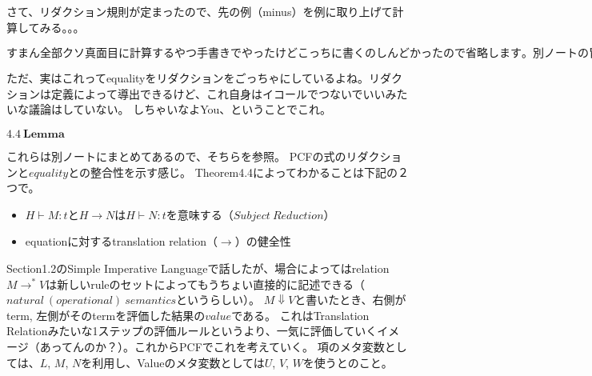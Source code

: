 \documentclass[9pt,fleqn]{jarticle}
\begin{document}
\nl

さて、リダクション規則が定まったので、先の例（minus）を例に取り上げて計算してみる。。。

\nl
$\bm{すまん全部クソ真面目に計算するやつ手書きでやったけどこっちに書くのしんどかったので省略します。別ノートの冒頭に個人的な歴史的経緯からAddの例を書いたやつがあるので（minusでなくてすまん）気になったらそっちを見てください。定義どおりにやるだけなので難しくないです。}$
\nl

ただ、実はこれってequalityをリダクションをごっちゃにしているよね。リダクションは定義によって導出できるけど、これ自身はイコールでつないでいいみたいな議論はしていない。
しちゃいなよYou、ということでこれ。


\nl
$\bm{4.4\ Lemma}$
\nl

これらは別ノートにまとめてあるので、そちらを参照。
PCFの式のリダクションと$equality$との整合性を示す感じ。
Theorem4.4によってわかることは下記の２つで。
\begin{itemize}
	\item[1] $H \vdash M : t $と$H \rightarrow N$は$H \vdash N : t$を意味する（$Subject\ Reduction$）
	\item[2] equationに対するtranslation relation（$\rightarrow$）の健全性
\end{itemize}

Section1.2のSimple Imperative Languageで話したが、場合によってはrelation $M \rightarrow^{*} V$は新しいruleのセットによってもうちょい直接的に記述できる（$natural\ (operational)\ semantics$というらしい）。
$M \Downarrow V$と書いたとき、右側がterm, 左側がそのtermを評価した結果の$value$である。
これはTranslation Relationみたいな1ステップの評価ルールというより、一気に評価していくイメージ（あってんのか？）。これからPCFでこれを考えていく。
項のメタ変数としては、$L$, $M$, $N$を利用し、Valueのメタ変数としては$U$, $V$, $W$を使うとのこと。
\end{document}
